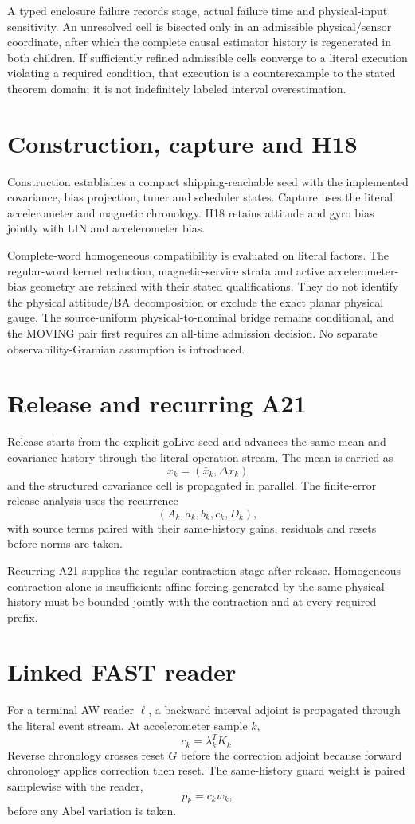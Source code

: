 \documentclass[journal]{IEEEtran}
\begin{document}
A typed enclosure failure records stage, actual failure time and physical-input sensitivity. An unresolved cell is bisected only in an admissible physical/sensor coordinate, after which the complete causal estimator history is regenerated in both children. If sufficiently refined admissible cells converge to a literal execution violating a required condition, that execution is a counterexample to the stated theorem domain; it is not indefinitely labeled interval overestimation.

\section{Construction, capture and H18}
Construction establishes a compact shipping-reachable seed with the implemented covariance, bias projection, tuner and scheduler states. Capture uses the literal accelerometer and magnetic chronology. H18 retains attitude and gyro bias jointly with LIN and accelerometer bias.

Complete-word homogeneous compatibility is evaluated on literal factors. The regular-word kernel reduction, magnetic-service strata and active accelerometer-bias geometry are retained with their stated qualifications. They do not identify the physical attitude/BA decomposition or exclude the exact planar physical gauge. The source-uniform physical-to-nominal bridge remains conditional, and the MOVING pair first requires an all-time admission decision. No separate observability-Gramian assumption is introduced.

\section{Release and recurring A21}
Release starts from the explicit goLive seed and advances the same mean and covariance history through the literal operation stream. The mean is carried as
\[
x_k=(\bar x_k,\Delta x_k)
\]
and the structured covariance cell is propagated in parallel. The finite-error release analysis uses the recurrence
\[
(A_k,a_k,b_k,c_k,D_k),
\]
with source terms paired with their same-history gains, residuals and resets before norms are taken.

Recurring A21 supplies the regular contraction stage after release. Homogeneous contraction alone is insufficient: affine forcing generated by the same physical history must be bounded jointly with the contraction and at every required prefix.

\section{Linked FAST reader}
For a terminal AW reader \(\ell\), a backward interval adjoint is propagated through the literal event stream. At accelerometer sample \(k\),
\[
c_k=\lambda_k^T K_k.
\]
Reverse chronology crosses reset \(G\) before the correction adjoint because forward chronology applies correction then reset. The same-history guard weight is paired samplewise with the reader,
\[
p_k=c_kw_k,
\]
before any Abel variation is taken.
\end{document}
